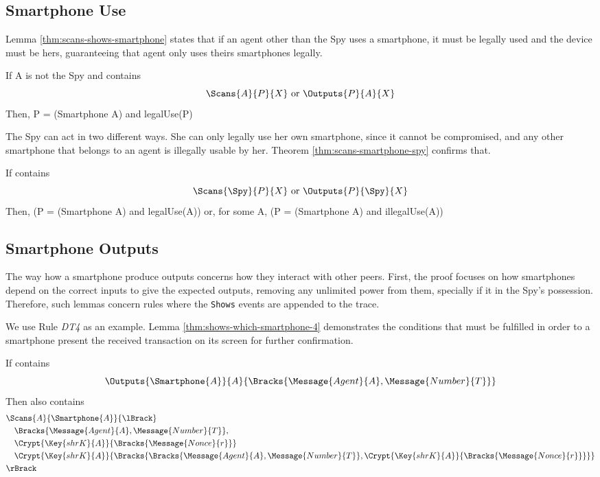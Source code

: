 \subsection{Smartphone Use}
Lemma \ref{thm:scans-shows-smartphone} states that if an agent other than the Spy uses a smartphone, it must be legally used and the device must be hers, guaranteeing that agent only uses theirs smartphones legally.

\begin{lemma}
\label{thm:scans-shows-smartphone}
  If A is not the Spy and  contains
  \[\Scans{A}{P}{X}\ \text{or}\ \Outputs{P}{A}{X}\]
  Then, P = (Smartphone A) and legalUse(P)
\end{lemma}

The Spy can act in two different ways. She can only legally use her own smartphone, since it cannot be compromised, and any other smartphone that belongs to an agent is illegally usable by her. Theorem \ref{thm:scans-smartphone-spy} confirms that.

\begin{lemma}
  \label{thm:scans-smartphone-spy}
  If  contains
  \[\Scans{\Spy}{P}{X} \ \text{or} \ \Outputs{P}{\Spy}{X}\]
  Then, (P = (Smartphone A) and legalUse(A)) or, for some A, (P = (Smartphone A) and illegalUse(A))
\end{lemma}

\subsection{Smartphone Outputs}
The way how a smartphone produce outputs concerns how they interact with other peers. First, the proof focuses on how smartphones depend on the correct inputs to give the expected outputs, removing any unlimited power from them, specially if it in the Spy's possession. Therefore, such lemmas concern rules where the \texttt{Shows} events are appended to the trace. 

We use Rule \textit{DT4} as an example. Lemma \ref{thm:shows-which-smartphone-4} demonstrates the conditions that must be fulfilled in order to a smartphone present the received transaction on its screen for further confirmation. 

\begin{theorem}
\label{thm:shows-which-smartphone-4}
  If  contains
  \[\Outputs{\Smartphone{A}}{A}{\Bracks{\Message{Agent}{A}, \Message{Number}{T}}}\]
  Then  also contains
  \begin{align*}
    & \Scans{A}{\Smartphone{A}}{\lBrack} \\
      & \quad \Bracks{\Message{Agent}{A}, \Message{Number}{T}}, \\
      & \quad \Crypt{\Key{shrK}{A}}{\Bracks{\Message{Nonce}{r}}} \\
      & \quad \Crypt{\Key{shrK}{A}}{\Bracks{\Bracks{\Message{Agent}{A}, \Message{Number}{T}},\Crypt{\Key{shrK}{A}}{\Bracks{\Message{Nonce}{r}}}}} \\
    & \rBrack
  \end{align*}
\end{theorem}

